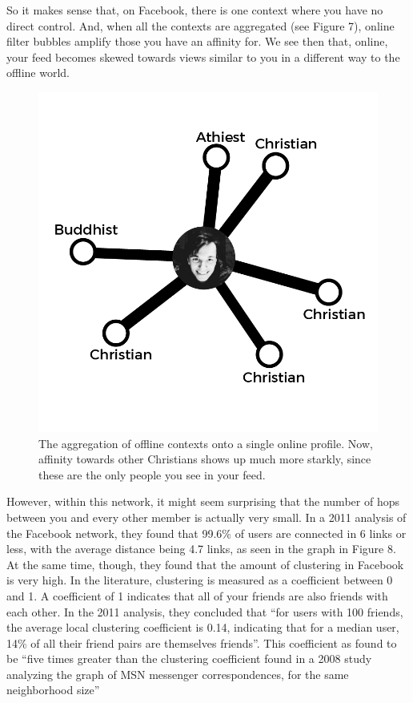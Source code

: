 \documentclass[]{article}
\begin{document}
So it makes sense that, on Facebook, there is one context where you have
no direct control. And, when all the contexts are aggregated (see Figure
7), online filter bubbles amplify those you have an affinity for. We see
then that, online, your feed becomes skewed towards views similar to you
in a different way to the offline world.

\begin{figure}
\centering
\includegraphics{./NetworkDiagram1_2.png}
\caption{The aggregation of offline contexts onto a single online
profile. Now, affinity towards other Christians shows up much more
starkly, since these are the only people you see in your feed.}
\end{figure}

However, within this network, it might seem surprising that the number
of hops between you and every other member is actually very small. In a
2011 analysis of the Facebook network, they found that 99.6\% of users
are connected in 6 links or less, with the average distance being 4.7
links\autocite[pg 4-5]{UganderAnatomyFacebookSocial2011}, as seen in the
graph in Figure 8. At the same time, though, they found that the amount
of clustering in Facebook is very high. In the literature, clustering is
measured as a coefficient between 0 and 1. A coefficient of 1 indicates
that all of your friends are also friends with each other. In the 2011
analysis, they concluded that ``for users with 100 friends, the average
local clustering coefficient is 0.14, indicating that for a median user,
14\% of all their friend pairs are themselves
friends''\autocite[pg 6]{UganderAnatomyFacebookSocial2011}. This
coefficient as found to be ``five times greater than the clustering
coefficient found in a 2008 study analyzing the graph of MSN messenger
correspondences, for the same neighborhood
size''\autocite[pg 6]{UganderAnatomyFacebookSocial2011}
\end{document}

